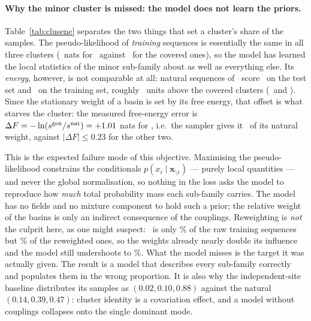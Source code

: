 \documentclass[10pt,a4paper]{article}
\begin{document}
\paragraph{Why the minor cluster is missed: the model does not learn the priors.}
Table~\ref{tab:clusene} separates the two things that set a cluster's share of the samples.
The pseudo-likelihood of \emph{training} sequences is essentially the same in all three clusters
(\PLLmissTrain\ nats for \MissCl\ against \PLLcovTrain\ for the covered ones), so the model has
learned the local statistics of the minor sub-family about as well as everything else. Its
\emph{energy}, however, is not comparable at all: natural sequences of \MissCl\ score
\EmissTest\ on the test set and \EmissTrain\ on the training set, roughly \EgapMiss\ units above
the covered clusters (\EcovTest\ and \EcovTrain). Since the stationary weight of a basin is set by
its free energy, that offset is what starves the cluster: the measured free-energy error is
$\Delta F=-\ln(s^\text{gen}/s^\text{nat})=+1.01$ nats for \MissCl, i.e.\ the sampler gives it
\dFmissFac\ of its natural weight, against $|\Delta F|\le0.23$ for the other two.

This is the expected failure mode of this objective. Maximising the pseudo-likelihood constrains
the conditionals $p(x_i\mid\bm x_{\setminus i})$ --- purely local quantities --- and never the
global normalisation, so nothing in the loss asks the model to reproduce how \emph{much} total
probability mass each sub-family carries. The model has no fields and no mixture component to hold
such a prior; the relative weight of the basins is only an indirect consequence of the couplings.
Reweighting is \emph{not} the culprit here, as one might suspect: \MissCl\ is only
\RawShareMiss\% of the raw training sequences but \ClTrain\% of the reweighted ones, so the weights
already nearly double its influence and the model still undershoots to \ClOne\%. What the model
misses is the target it was actually given. The result is a model that describes
every sub-family correctly and populates them in the wrong proportion. It is also why the
independent-site baseline distributes its samples as $(0.02,0.10,0.88)$ against the natural
$(0.14,0.39,0.47)$: cluster identity is a covariation effect, and a model without couplings
collapses onto the single dominant mode.

\begin{table}[h]\centering\small

\caption{Per-cluster diagnosis of the sampling weights ($\beta=1$). Weight shares and
$\langle\cdot\rangle$ use the reweighting weights for the natural sets. $\Delta F=-\ln(
s^\text{gen}/s^\text{nat})$ is the model's free-energy error for the cluster, in nats.
$^{\dagger}$: the cluster the sampler misses. The conditionals are fitted equally well everywhere
($\langle\log\mathrm{PL}\rangle$ on train), but the energy of \MissCl\ is far higher, so its
Boltzmann weight is far too small.}
\label{tab:clusene}
\end{table}
\end{document}
